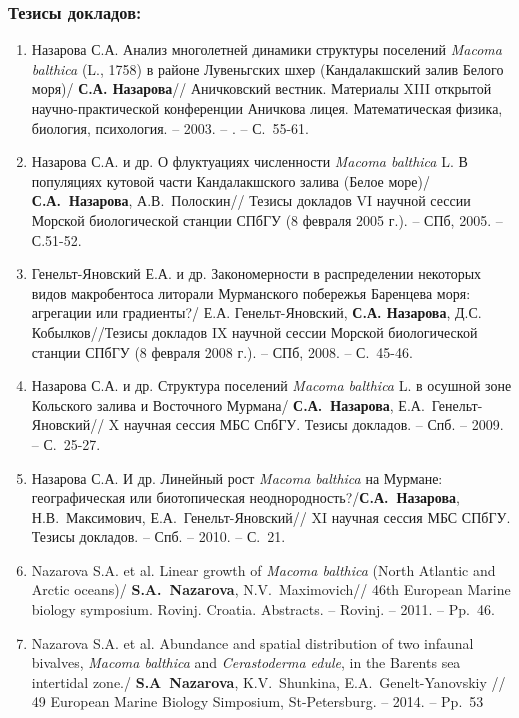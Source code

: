 {\begin{small}
\subsubsection*{Тезисы докладов:}
\begin{enumerate}
\item Назарова С.А. Анализ многолетней динамики структуры поселений \textit{Macoma balthica} (L., 1758) в районе Лувеньгских шхер (Кандалакшский залив Белого моря)/ \textbf{С.А. Назарова}// Аничковский вестник. Материалы XIII открытой научно-практической конференции Аничкова лицея. Математическая физика, биология, психология. -- 2003. -- . -- С.~55-61.
\item Назарова С.А.  и др. О флуктуациях численности \textit{Macoma balthica} L. В популяциях кутовой части Кандалакшского залива (Белое море)/ \textbf{С.А.~Назарова}, А.В.~Полоскин// Тезисы докладов VI научной сессии Морской биологической станции СПбГУ (8 февраля 2005 г.). -- СПб, 2005. -- С.51-52.
\item Генельт-Яновский Е.А. и др. Закономерности в распределении некоторых видов макробентоса литорали Мурманского побережья Баренцева моря: агрегации или градиенты?/ Е.А. Генельт-Яновский, \textbf{С.А. Назарова}, Д.С. Кобылков//Тезисы докладов IX научной сессии Морской биологической станции СПбГУ (8 февраля 2008 г.). -- СПб, 2008. -- С.~45-46.
\item Назарова С.А. и др. Структура поселений \textit{Macoma balthica} L. в осушной зоне Кольского залива и Восточного Мурмана/ \textbf{С.А.~Назарова}, Е.А.~Генельт-Яновский// X научная сессия МБС СпбГУ. Тезисы докладов. -- Спб. -- 2009. -- С.~25-27.
\item Назарова С.А. И др. Линейный рост \textit{Macoma balthica} на Мурмане: географическая или биотопическая неоднородность?/\textbf{С.А.~Назарова},  Н.В.~Максимович, Е.А.~Генельт-Яновский// XI научная сессия МБС СПбГУ. Тезисы докладов. -- Спб. -- 2010. -- С.~21. 
\item Nazarova S.A. et al. Linear growth of \textit{Macoma balthica} (North Atlantic and Arctic oceans)/ \textbf{S.A.~Nazarova}, N.V.~Maximovich// 46th European Marine biology symposium. Rovinj. Croatia. Abstracts. -- Rovinj. -- 2011. -- Pp.~46.
\item Nazarova S.A. et al. Abundance and spatial distribution of two infaunal bivalves, \textit{Macoma balthica} and \textit{Cerastoderma edule}, in the Barents sea intertidal zone./ \textbf{S.A~Nazarova}, K.V.~Shunkina, E.A.~Genelt-Yanovskiy // 49 European Marine Biology Simposium, St-Petersburg. -- 2014. -- Pp.~53

\end{enumerate}
\end{small}}
